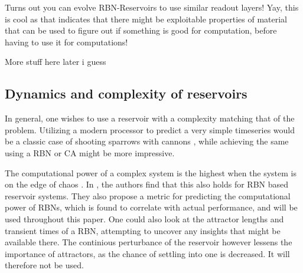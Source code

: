 
Turns out you can evolve RBN-Reservoirs to use similar readout layers!
Yay, this is cool as that indicates that there might be exploitable properties of material that can be used to figure out if something is good for computation, before having to use it for computations!

More stuff here later i guess

\subsection{Dynamics and complexity of reservoirs}

In general, one wishes to use a reservoir with a complexity matching that of the problem.
Utilizing a modern processor to predict a very simple timeseries would be a classic case of shooting sparrows with cannons \cite{wiki:sparrow},
while achieving the same using a RBN or CA might be more impressive.

The computational power of a complex system is the highest when the system is on the edge of chaos \cite{langton3computation}.
In \cite{rbn-reservoir}, the authors find that this also holds for RBN based reservoir systems.
They also propose a metric for predicting the computational power of RBNs,
which is found to correlate with actual performance,
and will be used throughout this paper.
One could also look at the attractor lengths and transient times of a RBN,
attempting to uncover any insights that might be available there.
The continious perturbance of the reservoir however lessens the importance of attractors,
as the chance of settling into one is decreased.
It will therefore not be used.
